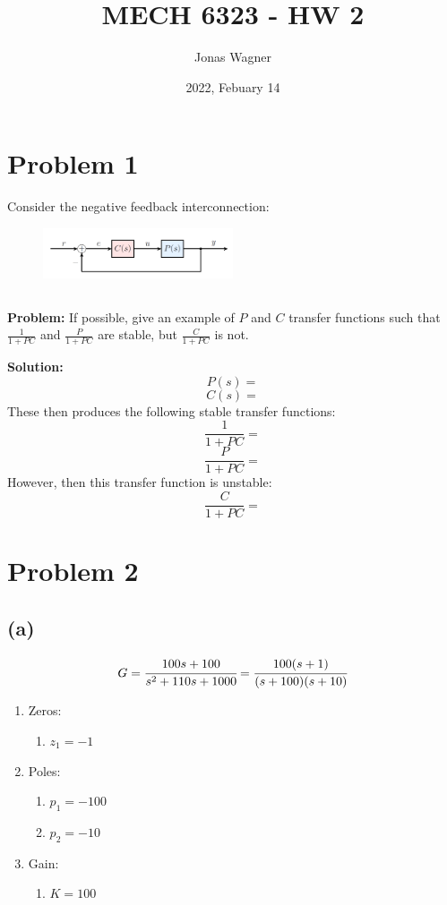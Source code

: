 \documentclass[letter]{article}
\title{MECH 6323 - HW 2}
\author{Jonas Wagner}
\date{2022, Febuary 14}
\numberwithin{equation}{section}
\begin{document}
	

\maketitle

\tableofcontents

\newpage
\section{Problem 1}
Consider the negative feedback interconnection:
\begin{figure}[ht]
	\centering
	\includegraphics[width=0.5\textwidth]{figs/pblm1.png}
\end{figure}
\subsection{}
\textbf{Problem:} 
If possible, give an example of $P$ and $C$ transfer functions such that $\frac{1}{1+PC}$ and $\frac{P}{1+PC}$ are stable, but $\frac{C}{1+PC}$ is not.

\textbf{Solution:}
\[
	P(s) = 
\]\[
	C(s) = 
\]
These then produces the following stable transfer functions:
\[
	\frac{1}{1+PC} = 
\]\[
	\frac{P}{1+PC} = 
\]
However, then this transfer function is unstable:
\[
	\frac{C}{1+PC} = 
\]










\newpage
\section{Problem 2}
\subsection{(a)}
\[
	G = \cfrac{
		100 s + 100
	}{
		s^2 + 110s + 1000
	}
	= \cfrac{
		100 (s+1)
	}{
		(s+100) (s+10)
	}
\]
\begin{enumerate}
	\item Zeros:
	\begin{enumerate}
		\item $z_1 = -1$
	\end{enumerate}
	\item Poles:
	\begin{enumerate}
		\item $p_1 = -100$
		\item $p_2 = -10$
	\end{enumerate}
	\item Gain:
	\begin{enumerate}
		\item $K = 100$
	\end{enumerate}
\end{enumerate}
\end{document}
